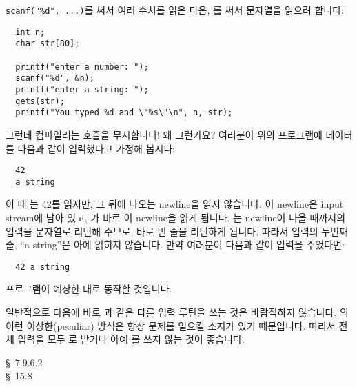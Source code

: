\begin{faq}
	\verb+scanf("%d", ...)+를 써서 여러 수치를 읽은 다음,
	를 써서 문자열을 읽으려 합니다:
\begin{verbatim}
  int n;
  char str[80];

  printf("enter a number: ");
  scanf("%d", &n);
  printf("enter a string: ");
  gets(str);
  printf("You typed %d and \"%s\"\n", n, str);
\end{verbatim}

	그런데 컴파일러는  호출을 무시합니다!
	왜 그런가요?
\A
	여러분이 위의 프로그램에 데이터를 다음과 같이 입력했다고 가정해
	봅시다:
\begin{verbatim}
  42
  a string
\end{verbatim}
	이 때 는 42를 읽지만, 그 뒤에 나오는 newline을 읽지 않습니다.
	이 newline은 input stream에 남아 있고, 가 바로 이
	newline을 읽게 됩니다.  는 newline이 나올 때까지의 입력을
	문자열로 리턴해 주므로, 바로 빈 줄을 리턴하게 됩니다.
	따라서 입력의 두번째 줄, ``a string''은 아예 읽히지 않습니다.
	만약 여러분이 다음과 같이 입력을 주었다면:
\begin{verbatim}
  42 a string
\end{verbatim}
	프로그램이 예상한 대로 동작할 것입니다.

	일반적으로  다음에 바로 과 같은 다른
	입력 루틴을 쓰는 것은 바람직하지 않습니다.  의
	이런 이상한(peculiar) 방식은 항상 문제를 일으킬 소지가 있기 때문입니다.
	따라서 전체 입력을 모두 로 받거나 아예 를 쓰지
	않는 것이 좋습니다.

\R
	\cite{c89} \S\ 7.9.6.2 \\
	\cite{hs} \S\ 15.8 
\end{faq}


